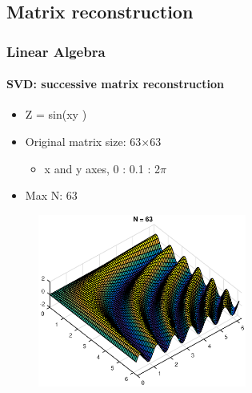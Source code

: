 \documentclass[hyperref={pdfpagelabels=true}]{beamer}
\begin{document}
\subsection{Matrix reconstruction}
\begin{frame}
\frametitle{Linear Algebra}
\framesubtitle{SVD: successive matrix reconstruction}
\small{
\begin{itemize}
\item Z = sin(xy )
\item Original matrix size: 63$\times$63
\begin{itemize}
\item[\ding{44}] x and y axes, 0 : 0.1 : 2$\pi$
\end{itemize}
\item Max N: 63
\end{itemize}}
\begin{figure}[!htb]
\centering
\includegraphics [width=2.7in]{figs/abc_01.eps}
\end{figure}
\end{frame}
\end{document}
